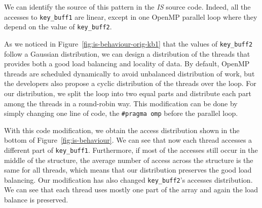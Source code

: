 %

We can identify the source of this pattern in the \emph{IS} source code. Indeed, all the accesses to \texttt{key\_buff1} are linear,
except in one OpenMP parallel loop where they depend on the value of
\texttt{key\_buff2}.

As we noticed in Figure~\ref{fig:is-behaviour-orig-kb1} that the values of \texttt{key\_buff2}
follow a Gaussian distribution, we can design a distribution of the threads that
provides both a good load balancing and locality of data.
By default, OpenMP threads are scheduled dynamically to avoid unbalanced
distribution of work, but the developers also propose a cyclic distribution
of the threads over the loop.
For our distribution, we split
the loop into two equal parts and distribute each part among the threads in a round-robin way.
This modification can be done by simply changing one line of code, the
\texttt{\#pragma omp} before the parallel loop.



With this code modification, we obtain the access distribution shown in
the bottom of Figure~\ref{fig:is-behaviour}. We can see that now each thread
accesses a different part of \texttt{key\_buff1}. Furthermore, if most of the
accesses still occur in the middle of the structure, the average number of
access across the structure is the same for all threads, which means that our
distribution preserves the good load balancing. Our modification has also
changed \texttt{key\_buff2}'s accesses distribution. We can see that each
thread uses mostly one part of the array and again the load balance is
preserved.

